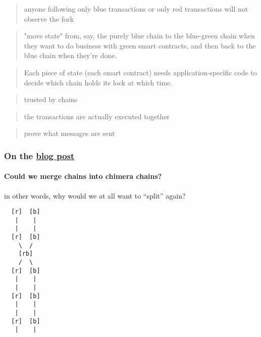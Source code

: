 \documentclass{article}
\theoremstyle{definition}
\begin{document}
\begin{quote}
    anyone following only blue transactions or only red transactions will not observe the fork
\end{quote}

  \begin{quote}
  "move state" from, say, the purely blue chain to the blue-green chain when they want to do business with green smart contracts, and then back to the blue chain when they're done.
\end{quote}

\begin{quote}
  Each piece of state (each smart contract) needs application-specific code to decide which chain holds its lock at which time.
\end{quote}
\begin{quote}
  trusted by chains
\end{quote}

\begin{quote}
  the transactions are actually executed together
\end{quote}

\begin{quote}
  prove what messages are sent
\end{quote}
\subsubsection{On the %
  \href{https://anoma.net/blog/heterogeneous-paxos-and-multi-chain-atomic-commits/}{%
    blog post%
  }
}
\label{sec:blog-post-discussion}

\paragraph{Could we merge chains into chimera chains?}

in other words,
why would we at all want to “split” again?

\begin{verbatim}
  [r]  [b]
   |    |
   |    |
  [r]  [b]
    \  / 
    [rb]
    /  \ 
  [r]  [b]
   |    |
   |    |
  [r]  [b]
   |    |
   |    |
  [r]  [b]
   |    |
\end{verbatim}
\end{document}
